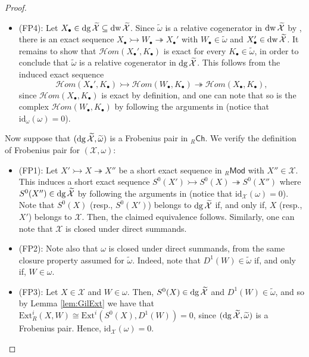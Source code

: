 \documentclass[10pt,reqno]{amsart}
\numberwithin{equation}{section}
\theoremstyle{remark}
\newcommand{\Ext}{\mathrm{Ext}}
\newcommand{\X}{\mathcal{X}}
\newcommand{\id}{\mathrm{id}}
\begin{document}
\begin{proof}
\begin{itemize}
\item {\sf (FP4)}: Let $X_{\bullet} \in {\rm dg}\,\widetilde{\X} \subseteq {\rm dw}\,\widetilde{\X}$. Since $\widetilde{\omega}$ is a relative cogenerator in ${\rm dw}\,\widetilde{\X}$ by \cite[Thm. 3.3]{LiangYangConstructions},  there is an exact sequence $X_{\bullet} \rightarrowtail W_{\bullet} \twoheadrightarrow X_{\bullet}'$ with $W_{\bullet} \in \widetilde{\omega}$ and $X_{\bullet}' \in {\rm dw}\,\widetilde{\X}$. It remains to show that $\mathcal{H}om(X_{\bullet}', K_{\bullet})$ is exact for every $K_{\bullet} \in \widetilde{\omega}$, in order to conclude that $\widetilde{\omega}$ is a relative cogenerator in ${\rm dg}\,\widetilde{\X}$. This follows from the induced exact sequence 
\[
\mathcal{H}om (X_{\bullet}', K_{\bullet}) \rightarrowtail \mathcal{H}om(W_{\bullet}, K_{\bullet}) \twoheadrightarrow \mathcal{H}om (X_{\bullet}, K_{\bullet}),
\] 
since $\mathcal{H}om (X_{\bullet}, K_{\bullet})$ is exact by definition, and one can note that so is the complex $\mathcal{H}om(W_{\bullet}, K_{\bullet})$ by following the arguments in \cite[proof of Lem. 3.9]{GillespieFlat} (notice that $\id_\omega(\omega) = 0$).
\end{itemize} 

Now suppose that $({\rm dg}\,\widetilde{\X},\widetilde{\omega})$ is a Frobenius pair in ${}_R\mathsf{Ch}$. We verify the definition of Frobenius pair for $(\X,\omega)$:
\begin{itemize}
\item {\sf (FP1)}: Let $X' \rightarrowtail X \twoheadrightarrow X''$ be a short exact sequence in ${}_R\mathsf{Mod}$ with $X'' \in \X$. This induces a short exact sequence $S^0(X') \rightarrowtail S^0(X) \twoheadrightarrow S^0(X'')$ where $S^0(X'') \in {\rm dg}\,\widetilde{\X}$ by following the arguments in \cite[Lem. 3.4]{GillespieFlat} (notice that $\id_{\X}(\omega) = 0$). Note that $S^0(X)$ (resp., $S^0(X')$) belongs to ${\rm dg}\,\widetilde{\X}$ if, and only if, $X$ (resp., $X'$) belongs to $\X$. Then, the claimed equivalence follows. Similarly, one can note that $\X$ is closed under direct summands. 

\item {\sf (FP2)}: Note also that $\omega$ is closed under direct summands, from the same closure property assumed for $\widetilde{\omega}$. Indeed, note that $D^1(W) \in \widetilde{\omega}$ if, and only if, $W \in \omega$.

\item {\sf (FP3)}: Let $X \in \X$ and $W \in \omega$. Then, $S^0(X) \in {\rm dg}\,\widetilde{\X}$ and $D^1(W) \in \widetilde{\omega}$, and so by Lemma \ref{lem:GilExt} we have that $\Ext^i_R(X,W) \cong \Ext^i(S^0(X),D^1(W)) = 0$, since $({\rm dg}\,\widetilde{\X},\widetilde{\omega})$ is a Frobenius pair. Hence, $\id_{\X}(\omega) = 0$. 


\end{itemize}
\end{proof}
\end{document}
